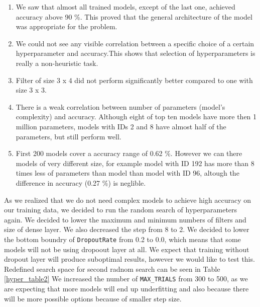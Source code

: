 \begin{enumerate}
    \item We saw that almost all trained models, except of the last one, achieved accuracy above 90 \%. This proved that the general architecture of the model was appropriate for the problem.
    \item We could not see any visible correlation between a specific choice of a certain hyperparameter and accuracy.This shows that selection of hyperparameters is really a non-heuristic task.
    \item Filter of size 3 x 4 did not perform significantly better compared to one with size 3 x 3. 
    \item There is a weak correlation between number of parameters (model's complexity) and accuracy. Although eight of top ten models have more then 1 million parameters, models with IDs 2 and 8 have almost half of the parameters, but still perform well.
    \item First 200 models cover a accuracy range of 0.62 \%. However we can there models of very different size, for example model with ID 192 has more than 8 times less of parameters than model than model with ID 96, altough the difference in accuracy (0.27 \%) is neglible.
\end{enumerate}

As we realized that we do not need complex models to achieve high accuracy on our training data, we decided to run the random search of hyperparameters again.
We decided to lower the maximum and minimum numbers of filters and size of dense layer.
We also decreased the step from 8 to 2.
We decided to lower the bottom boundry of \verb|DropoutRate| from 0.2 to 0.0, which means that some models will not be using dropoout layer at all.
We expect that training without dropout layer will produce suboptimal results, however we would like to test this.
Redefined search space for second radnom search can be seen in Table \ref{hyper_table2}
We increased the number of \verb|MAX_TRIALS| from 300 to 500, as we are expecting that more models will end up underfitting and also because there will be more possible options because of smaller step size.

